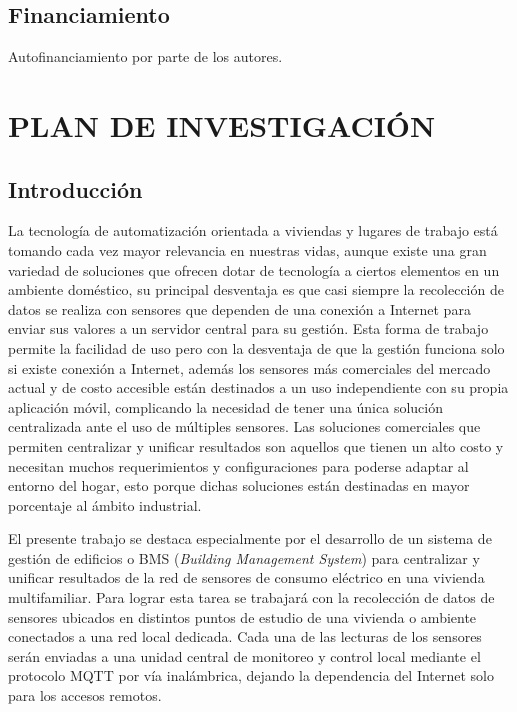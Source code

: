 \documentclass[a4paper, 12pt]{article}
\begin{document}

\subsection{Financiamiento}

Autofinanciamiento por parte de los autores.




\section{PLAN DE INVESTIGACIÓN}

\subsection{Introducción}
La tecnología de automatización orientada a viviendas y lugares de trabajo está tomando cada vez mayor relevancia en nuestras vidas, aunque existe una gran variedad de soluciones que ofrecen dotar de tecnología a ciertos elementos en un ambiente doméstico, su principal desventaja es que casi siempre la recolección de datos se realiza con sensores que dependen de una conexión a Internet para enviar sus valores a un servidor central para su gestión. Esta forma de trabajo permite la facilidad de uso pero con la desventaja de que la gestión funciona solo si existe conexión a Internet, además los sensores más comerciales del mercado actual y de costo accesible están destinados a un uso independiente con su propia aplicación móvil, complicando la necesidad de tener una única solución centralizada ante el uso de múltiples sensores. Las soluciones comerciales que permiten centralizar y unificar resultados son aquellos que tienen un alto costo y necesitan muchos requerimientos y configuraciones para poderse adaptar al entorno del hogar, esto porque dichas soluciones están destinadas en mayor porcentaje al ámbito industrial.

\vspace{0.25cm}
El presente trabajo se destaca especialmente por el desarrollo de un sistema de gestión de edificios o BMS (\emph{Building Management System}) para centralizar y unificar resultados de la red de sensores de consumo eléctrico en una vivienda  multifamiliar. Para lograr esta tarea se trabajará con la recolección de datos de sensores ubicados en distintos puntos de estudio de una vivienda o ambiente conectados a una red local dedicada. Cada una de las lecturas de los sensores serán enviadas a una unidad central  de monitoreo y control local mediante el protocolo MQTT por vía inalámbrica, dejando la dependencia del Internet solo para los accesos remotos.
\end{document}
